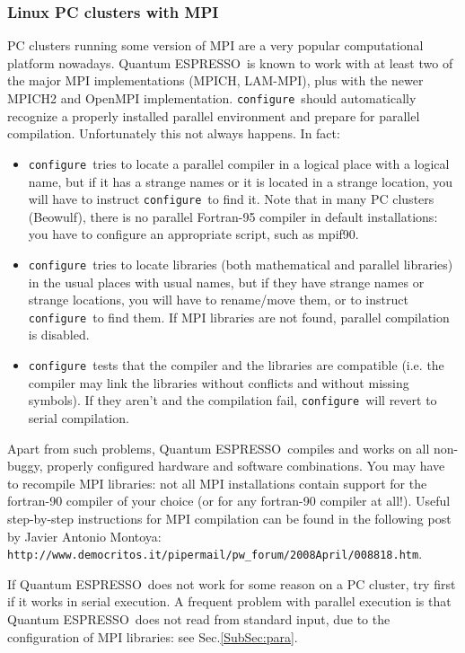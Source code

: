 \documentclass[12pt,a4paper]{article}
\def\qe{{\sc Quantum ESPRESSO}}
\def\configure{\texttt{configure}}
\begin{document}
\subsubsection{Linux PC clusters with MPI}
\label{SubSec:LinuxPCMPI}
PC clusters running some version of MPI are a very popular
computational platform nowadays. \qe\ is known to work
with at least two of the major MPI implementations (MPICH, LAM-MPI),
plus with the newer MPICH2 and OpenMPI implementation. 
\configure\ should automatically recognize a properly installed
parallel environment and prepare for parallel compilation. 
Unfortunately this not always happens. In fact:
\begin{itemize}
\item \configure\ tries to locate a parallel compiler in a logical
  place with a logical name,  but if it has a strange names or it is
  located  in a strange location, you will have to instruct \configure\ 
  to find it. Note that in many PC clusters (Beowulf), there is no
  parallel Fortran-95 compiler in default installations:  you have to
  configure an appropriate script, such as mpif90. 
\item \configure\ tries to locate libraries (both mathematical and
  parallel libraries) in the usual places with usual names, but if
  they have strange names or strange locations, you will have to
  rename/move them, or to instruct \configure\ to find them. If MPI
  libraries are not found,
  parallel compilation is disabled. 
\item \configure\ tests that the compiler and the libraries are
  compatible (i.e. the compiler may link the libraries without
  conflicts and without missing symbols). If they aren't and the
  compilation fail, \configure\ will revert to serial compilation. 
\end{itemize}

Apart from such problems, \qe\ compiles and works on all non-buggy, properly
configured hardware and software combinations. You may have to
recompile MPI libraries: not all MPI installations contain support for
the fortran-90 compiler of your choice (or for any fortran-90 compiler
at all!). Useful step-by-step instructions for MPI compilation can be 
found in the following post by  Javier Antonio Montoya:\\
\texttt{http://www.democritos.it/pipermail/pw\_forum/2008April/008818.htm}. 

If \qe\ does not work for some reason on a PC cluster,
try first if it works in serial execution. A frequent problem with parallel
execution is that \qe\ does not read from standard input,
due to the configuration of MPI libraries: see Sec.\ref{SubSec:para}.
\end{document}
